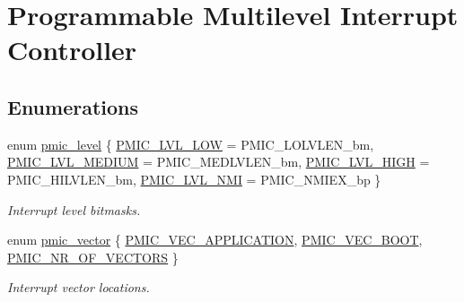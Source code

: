 \hypertarget{group__pmic__group}{\section{Programmable Multilevel Interrupt Controller}
\label{group__pmic__group}
}
\subsection*{Enumerations}
\begin{DoxyCompactItemize}
\item 
enum \hyperlink{group__pmic__group_ga786c118f55440742904207a0e1d269f9}{pmic\-\_\-level} \{ \hyperlink{group__pmic__group_gga786c118f55440742904207a0e1d269f9abe0a5276abcc96b4a31418bd3c2bc38d}{P\-M\-I\-C\-\_\-\-L\-V\-L\-\_\-\-L\-O\-W} =  P\-M\-I\-C\-\_\-\-L\-O\-L\-V\-L\-E\-N\-\_\-bm, 
\hyperlink{group__pmic__group_gga786c118f55440742904207a0e1d269f9a0b5735f19e2f64ad7a5e6c449e205df6}{P\-M\-I\-C\-\_\-\-L\-V\-L\-\_\-\-M\-E\-D\-I\-U\-M} =  P\-M\-I\-C\-\_\-\-M\-E\-D\-L\-V\-L\-E\-N\-\_\-bm, 
\hyperlink{group__pmic__group_gga786c118f55440742904207a0e1d269f9a86fe53d3ec057585ae994f92ac6fd3b4}{P\-M\-I\-C\-\_\-\-L\-V\-L\-\_\-\-H\-I\-G\-H} =  P\-M\-I\-C\-\_\-\-H\-I\-L\-V\-L\-E\-N\-\_\-bm, 
\hyperlink{group__pmic__group_gga786c118f55440742904207a0e1d269f9a45d75acaa1e3d8b74998cc4ac38739ba}{P\-M\-I\-C\-\_\-\-L\-V\-L\-\_\-\-N\-M\-I} =  P\-M\-I\-C\-\_\-\-N\-M\-I\-E\-X\-\_\-bp
 \}
\begin{DoxyCompactList}\small\item\em Interrupt level bitmasks. \end{DoxyCompactList}\item 
enum \hyperlink{group__pmic__group_gad564a55fdd5f3ed127228305e2205c38}{pmic\-\_\-vector} \{ \hyperlink{group__pmic__group_ggad564a55fdd5f3ed127228305e2205c38ac2633c604c83302fdd43b6ddde774516}{P\-M\-I\-C\-\_\-\-V\-E\-C\-\_\-\-A\-P\-P\-L\-I\-C\-A\-T\-I\-O\-N}, 
\hyperlink{group__pmic__group_ggad564a55fdd5f3ed127228305e2205c38a6b3b7bacd133cfe587cfd6d57669d8c0}{P\-M\-I\-C\-\_\-\-V\-E\-C\-\_\-\-B\-O\-O\-T}, 
\hyperlink{group__pmic__group_ggad564a55fdd5f3ed127228305e2205c38abc806a0b912309c8e7f31e22d41c6215}{P\-M\-I\-C\-\_\-\-N\-R\-\_\-\-O\-F\-\_\-\-V\-E\-C\-T\-O\-R\-S}
 \}
\begin{DoxyCompactList}\small\item\em Interrupt vector locations. \end{DoxyCompactList}\item 

\end{DoxyCompactItemize}
